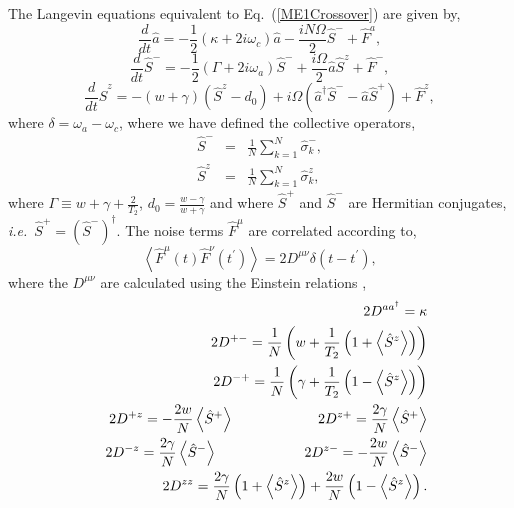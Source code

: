 \documentclass[aps,
twocolumn,
superscriptaddress,groupedaddress]{revtex4}
\begin{document}
The Langevin equations equivalent to Eq.~(\ref{ME1Crossover}) are given
by,
\begin{equation}
\frac{d}{dt} \hat{a}= -\frac{1}{2} (\kappa +2i\omega_c) \hat{a}
-\frac{i N \Omega}{2} \hat{S}^{-}
+\hat{F}^{a},
\label{La}
\end{equation}
\begin{equation}
\frac{d}{dt} \hat{S}^{-} =
-\frac{1}{2} \left(\Gamma +2 i \omega_a \right)  \hat{S}^{-}
+\frac{i \Omega}{2} \hat{a} \hat{S}^{z}
+\hat{F}^{-},
\label{Lsm}
\end{equation}
\begin{equation}
\frac{d}{dt} \hat{S}^{z} =
-(w+\gamma)\left( \hat{S}^{z} - d_0\right)
+i\Omega \left( \hat{a}^{\dagger}\hat{S}^{-} -
\hat{a}\hat{S}^{+} \right)
+\hat{F}^{z},
\label{Lsz}
\end{equation}
where $\delta=\omega_{a}-\omega_{c}$, where we have defined the collective
operators,
\begin{eqnarray}
\hat{S}^{-}&=&\frac{1}{N}\sum_{k=1}^N \hat{\sigma}_k^{-},
\nonumber
\\
\hat{S}^{z}&=&\frac{1}{N}\sum_{k=1}^N \hat{\sigma}_k^{z},
\nonumber
\end{eqnarray}
where $\Gamma \equiv w+\gamma+\frac{2}{T_2}$, $d_0 =
\frac{w-\gamma}{w+\gamma}$ and where $\hat{S}^{+}$ and $\hat{S}^{-}$ are Hermitian conjugates, {\em i.e.}\ $\hat{S}^{+} = (\hat{S}^{-})^{\dagger}$. The noise terms $\hat F^\mu$ are correlated
according to,
\begin{equation}
\left< \hat{F}^{\mu}(t) \hat{F}^{\nu}(t^{\prime})\right> =
2 D^{\mu \nu} \delta(t-t^{\prime}),
\end{equation}
where the $D^{\mu \nu} $ are calculated using the Einstein relations
\cite{meystre2007elements},
\begin{eqnarray}
&& 2D^{a a^{\dagger}}= \kappa \nonumber \\
&& 2D^{+-}= \frac{1}{N}
\left(
  w + \frac{1}{T_2} \left(1 + \left< \hat{S}^{z} \right> \right)
\right) \nonumber \\
&& 2D^{-+}= \frac{1}{N}
\left(
  \gamma + \frac{1}{T_2} \left(1- \left< \hat{S}^{z} \right> \right)
\right) \nonumber \\
&& 2D^{+z}= -\frac{2w}{N} \left< \hat{S}^{+} \right>
\hspace{0.83in} 2D^{z+}= \frac{2\gamma}{N} \left< \hat{S}^{+} \right>
\nonumber \\
&& 2D^{-z}= \frac{2\gamma}{N} \left< \hat{S}^{-} \right>
\hspace{0.86in} 2D^{z-}= -\frac{2w}{N} \left< \hat{S}^{-} \right>
\nonumber \\
&& 2D^{zz}= \frac{2\gamma}{N}
\left(1+ \left< \hat{S}^{z} \right> \right) +
\frac{2w}{N}\left(1- \left< \hat{S}^{z} \right> \right).
\label{OpNoise1}
\end{eqnarray}
\end{document}
